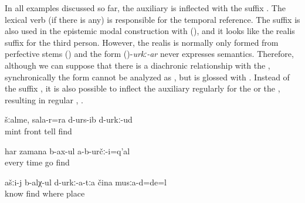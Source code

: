 In all examples discussed so far, the auxiliary is inflected with the suffix  . The lexical verb (if there is any) is responsible for the temporal reference. The suffix  is also used in the epistemic modal construction with  (), and it looks like the realis  suffix for the third person. However, the realis  is normally only formed from perfective stems () and the form ()-\textit{urkː-ar} never expresses  semantics. Therefore, although we can suppose that there is a diachronic relationship with the , synchronically the form cannot be analyzed as , but is glossed with . Instead of the suffix , it is also possible to inflect the auxiliary regularly for the   or the , resulting in regular   , .
%
\begin{exe}
	\ex	\label{ex:‎(It is made from) mint; I probably also told it (= how to make it) the last time}
	\gll	šːalme,	sala-r=ra	d-urs-ib	d-urkː-ud\\
		mint	front	tell	find\\
	\glt	{}
	
	\ex	\label{ex:‎‎Probably they did not always go (to drink milk)}
	\gll	har	zamana	b-ax-ul	a-b-určː-i=q'al\\
		every	time	go	find\\
	\glt	{}

	\ex	\label{ex:You should know / you probably know, where (in which place) they (the berries) were}
	\gll	ašːi-j	b-alχ-ul	d-urkː-a-tːa	čina	musːa-d=de=l\\
			know	find	where	place\\
	\glt	{}
\end{exe}

